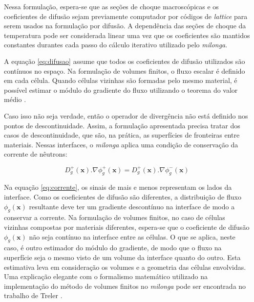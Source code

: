 Nessa formulação, espera-se que as seções de choque macroscópicas e os coeficientes de difusão sejam
previamente computador por códigos de \textit{lattice} para serem usados na formulação por difusão.
A dependência das seções de choque da temperatura pode ser considerada linear uma vez que
os coeficientes são mantidos constantes durantes cada passo do cálculo iterativo utilizado
pelo \textit{milonga}.

A equação \ref{eq:difusao} assume que todos os coeficientes de difusão utilizados são
contínuos no espaço. Na formulação de volumes finitos,
o fluxo escalar é definido em cada célula. Quando células vizinhas são formadas
pelo mesmo material, é possível estimar o módulo do gradiente do fluxo
utilizando o teorema do valor médio \cite{Theler2013b}.

Caso isso não seja verdade, então o operador de divergência não
está definido nos pontos de descontinuidade. Assim, a formulação apresentada precisa tratar
dos casos de descontinuidade, que são, na prática, as superfícies de fronteiras entre
materiais. Nessas interfaces, o \textit{milonga} aplica uma condição de
conservação da corrente de nêutrons:

\begin{equation}
  \label{eq:corrente}
  D_g^+(\mathbf{x}).\nabla \phi_g^+(\mathbf{x})=D_g^+(\mathbf{x}).\nabla \phi_g^-(\mathbf{x})
  \end{equation}

Na equação \ref{eq:corrente}, os sinais de mais e menos representam os lados da
interface. Como os coeficientes de difusão são diferentes, a distribuição de
fluxo $\phi_g(\mathbf{x})$ resultante deve ter um gradiente descontínuo na
interface de modo a conservar a corrente. Na formulação de volumes finitos,
no caso de células vizinhas compostas por materiais diferentes, espera-se que
o coeficiente de difusão $\phi_g(\mathbf{x})$ não seja contínuo na interface
entre as células. O que se aplica, neste caso, é outro estimador do módulo
do gradiente, de modo que o fluxo na superfície seja o mesmo visto de um volume
da interface quanto do outro. Esta estimativa leva em consideração os volumes e
a geometria das células envolvidas. Uma explicação elegante com o formalismo
matemático utilizado na implementação do método de volumes finitos no
\textit{milonga} pode ser encontrada no trabalho de Treler \cite[Seção 3.5.2]{Theler2016}.


